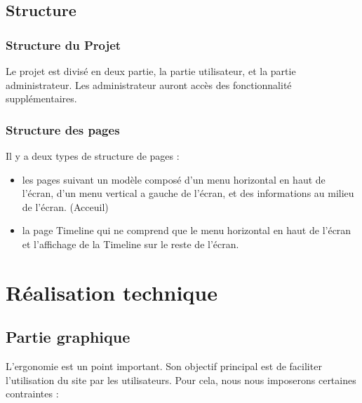 \documentclass[11pt]{article} %
\begin{document}
\subsection{Structure}

\subsubsection{Structure du Projet}Le projet est divisé en deux partie, la partie utilisateur, et la partie administrateur. Les administrateur auront accès des fonctionnalité supplémentaires.
\subsubsection{Structure des pages}
Il y a deux types de structure de pages :
\begin{itemize}
\item les pages suivant un modèle composé d’un menu horizontal en haut de l’écran, d’un menu vertical a gauche de l’écran, et des informations au milieu de l’écran. (Acceuil)
\item la page Timeline qui ne comprend que le menu horizontal en haut de l’écran et l’affichage de la Timeline sur le reste de l’écran. 
\end {itemize}



\section {Réalisation technique}

\subsection {Partie graphique}
L’ergonomie est un point important. Son objectif principal est de faciliter l’utilisation du site par les utilisateurs. Pour cela, nous nous imposerons certaines contraintes :
\end{document}
